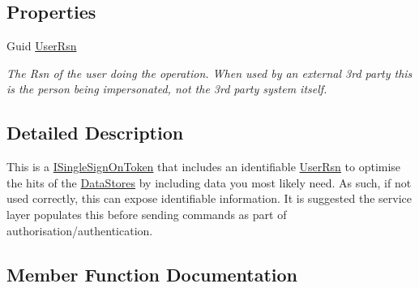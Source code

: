 \subsection*{Properties}
\begin{DoxyCompactItemize}
\item 
Guid \hyperlink{classCqrs_1_1Authentication_1_1SingleSignOnTokenWithUserRsn_a47d20dd286cf61cc23028e75cddcca79_a47d20dd286cf61cc23028e75cddcca79}{User\+Rsn}
\begin{DoxyCompactList}\small\item\em The Rsn of the user doing the operation. When used by an external 3rd party this is the person being impersonated, not the 3rd party system itself. \end{DoxyCompactList}\end{DoxyCompactItemize}


\subsection{Detailed Description}
This is a \hyperlink{interfaceCqrs_1_1Authentication_1_1ISingleSignOnToken}{I\+Single\+Sign\+On\+Token} that includes an identifiable \hyperlink{classCqrs_1_1Authentication_1_1SingleSignOnTokenWithUserRsn_a47d20dd286cf61cc23028e75cddcca79_a47d20dd286cf61cc23028e75cddcca79}{User\+Rsn} to optimise the hits of the \hyperlink{}{Data\+Stores} by including data you most likely need. As such, if not used correctly, this can expose identifiable information. It is suggested the service layer populates this before sending commands as part of authorisation/authentication. 



\subsection{Member Function Documentation}
\mbox{\label{classCqrs_1_1Authentication_1_1SingleSignOnTokenWithUserRsn_a8103820e6352c10b3990fb027dd9b5ae_a8103820e6352c10b3990fb027dd9b5ae}} 
